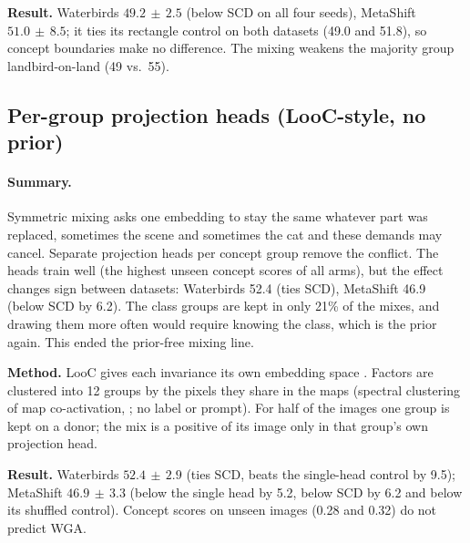 \documentclass[11pt]{article}
\newcommand{\pmsd}[2]{$#1{\scriptstyle\,\pm\,#2}$}
\newcommand{\summary}{\paragraph{Summary.}}
\begin{document}
\textbf{Result.} Waterbirds \pmsd{49.2}{2.5} (below SCD on all four seeds), MetaShift \pmsd{51.0}{8.5}; it ties its
rectangle control on both datasets (49.0 and 51.8), so concept boundaries make no difference. The mixing weakens the
majority group landbird-on-land (49 vs.\ 55).

\subsection{Per-group projection heads (LooC-style, no prior)}
\summary Symmetric mixing asks one embedding to stay the same whatever part was replaced, sometimes the scene and
sometimes the cat and these demands may cancel. Separate projection heads per concept group remove the conflict.
The heads train well (the highest unseen concept scores of all arms), but the effect changes sign between datasets:
Waterbirds 52.4 (ties SCD), MetaShift 46.9 (below SCD by 6.2). The class groups are kept in only 21\% of the mixes,
and drawing them more often would require knowing the class, which is the prior again. This ended the prior-free
mixing line.

\textbf{Method.} LooC gives each invariance its own embedding space \citep{xiao2021looc}. Factors are clustered into 12
groups by the pixels they share in the maps (spectral clustering of map co-activation, \citealp{ng2001spectral}; no
label or prompt). For half of the images one group is kept on a donor; the mix is a positive of its image only in that
group's own projection head.

\textbf{Result.} Waterbirds \pmsd{52.4}{2.9} (ties SCD, beats the single-head control by 9.5); MetaShift \pmsd{46.9}{3.3}
(below the single head by 5.2, below SCD by 6.2 and below its shuffled control). Concept scores on unseen images
(0.28 and 0.32) do not predict WGA.

\end{document}

